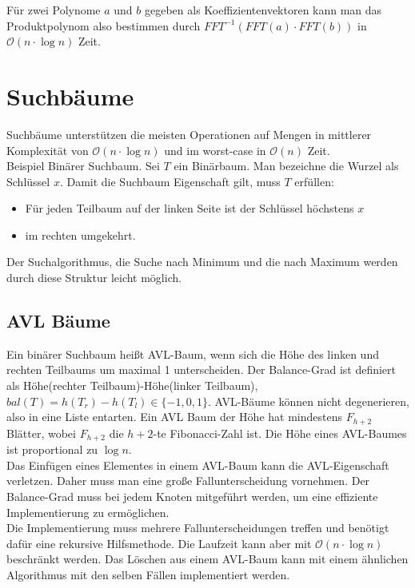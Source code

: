 \documentclass[a4paper, 12pt]{article}
\begin{document}
	Für zwei Polynome $a$ und $b$ gegeben als Koeffizientenvektoren kann man das Produktpolynom also bestimmen durch $FFT^{-1}(FFT(a)\cdot FFT(b))$ in $\mathcal{O}(n\cdot \log n)$ Zeit.
	
	\section{Suchbäume}
	Suchbäume unterstützen die meisten Operationen auf Mengen in mittlerer Komplexität von $\mathcal{O}(n\cdot \log n)$ und im worst-case in $\mathcal{O}(n)$ Zeit.\\
	Beispiel Binärer Suchbaum. Sei $T$ ein Binärbaum. Man bezeichne die Wurzel als Schlüssel $x$. Damit die Suchbaum Eigenschaft gilt, muss $T$ erfüllen: \begin{itemize}
		\item Für jeden Teilbaum auf der linken Seite ist der Schlüssel höchstens $x$
		\item im rechten umgekehrt.
	\end{itemize}
	Der Suchalgorithmus, die Suche nach Minimum und die nach Maximum werden durch diese Struktur leicht möglich.
	\subsection{AVL Bäume}
	Ein binärer Suchbaum heißt AVL-Baum, wenn sich die Höhe des linken und rechten Teilbaums um maximal 1 unterscheiden. Der Balance-Grad ist definiert als Höhe(rechter Teilbaum)-Höhe(linker Teilbaum), $bal(T) = h(T_r)-h(T_l) \in \{-1,0,1\}$. AVL-Bäume können nicht degenerieren, also in eine Liste entarten. Ein AVL Baum der Höhe hat mindestens $F_{h+2}$ Blätter, wobei $F_{h+2}$ die $h+2$-te Fibonacci-Zahl ist. Die Höhe eines AVL-Baumes ist proportional zu $\log n$.\\
	
	Das Einfügen eines Elementes in einem AVL-Baum kann die AVL-Eigenschaft verletzen. Daher muss man eine große Fallunterscheidung vornehmen. Der Balance-Grad muss bei jedem Knoten mitgeführt werden, um eine effiziente Implementierung zu ermöglichen.\\
	Die Implementierung muss mehrere Fallunterscheidungen treffen und benötigt dafür eine rekursive Hilfsmethode. Die Laufzeit kann aber mit $\mathcal{O}(n\cdot \log n)$ beschränkt werden. Das Löschen aus einem AVL-Baum kann mit einem ähnlichen Algorithmus mit den selben Fällen implementiert werden.
\end{document}
